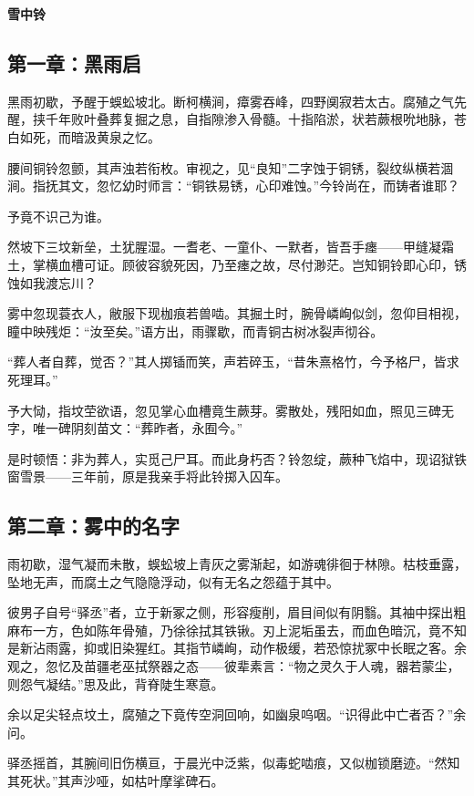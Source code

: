 \documentclass{article}
\begin{document}
	\begin{center}
		{\Large{\textbf{\heiti 雪中铃}}}
	\end{center}
	
	\subsection{第一章：黑雨启}
	
	黑雨初歇，予醒于蜈蚣坡北。断柯横涧，瘴雾吞峰，四野阒寂若太古。腐殖之气先醒，挟千年败叶叠葬复掘之息，自指隙渗入骨髓。十指陷淤，状若蕨根吮地脉，苍白如死，而暗汲黄泉之忆。
	
	腰间铜铃忽颤，其声浊若衔枚。审视之，见“良知”二字蚀于铜锈，裂纹纵横若涸涧。指抚其文，忽忆幼时师言：“铜铁易锈，心印难蚀。”今铃尚在，而铸者谁耶？
	
	予竟不识己为谁。
	
	然坡下三坟新垒，土犹腥湿。一耆老、一童仆、一默者，皆吾手瘗——甲缝凝霜土，掌横血槽可证。顾彼容貌死因，乃至瘗之故，尽付渺茫。岂知铜铃即心印，锈蚀如我渡忘川？
	
	雾中忽现蓑衣人，敝服下现枷痕若兽啮。其掘土时，腕骨嶙峋似剑，忽仰目相视，瞳中映残炬：“汝至矣。”语方出，雨骤歇，而青铜古树冰裂声彻谷。
	
	“葬人者自葬，觉否？”其人掷锸而笑，声若碎玉，“昔朱熹格竹，今予格尸，皆求死理耳。”
	
	予大恸，指坟茔欲语，忽见掌心血槽竟生蕨芽。雾散处，残阳如血，照见三碑无字，唯一碑阴刻苗文：“葬昨者，永囿今。”
	
	是时顿悟：非为葬人，实觅己尸耳。而此身朽否？铃忽绽，蕨种飞焰中，现诏狱铁窗雪景——三年前，原是我亲手将此铃掷入囚车。
	
	\subsection{第二章：雾中的名字}
	
	雨初歇，湿气凝而未散，蜈蚣坡上青灰之雾渐起，如游魂徘徊于林隙。枯枝垂露，坠地无声，而腐土之气隐隐浮动，似有无名之怨蕴于其中。
	
	彼男子自号“驿丞”者，立于新冢之侧，形容瘦削，眉目间似有阴翳。其袖中探出粗麻布一方，色如陈年骨殖，乃徐徐拭其铁锹。刃上泥垢虽去，而血色暗沉，竟不知是新沾雨露，抑或旧染猩红。其指节嶙峋，动作极缓，若恐惊扰冢中长眠之客。余观之，忽忆及苗疆老巫拭祭器之态——彼辈素言：“物之灵久于人魂，器若蒙尘，则怨气凝结。”思及此，背脊陡生寒意。
	
	余以足尖轻点坟土，腐殖之下竟传空洞回响，如幽泉呜咽。“识得此中亡者否？”余问。
	
	驿丞摇首，其腕间旧伤横亘，于晨光中泛紫，似毒蛇啮痕，又似枷锁磨迹。“然知其死状。”其声沙哑，如枯叶摩挲碑石。
	
\end{document}
